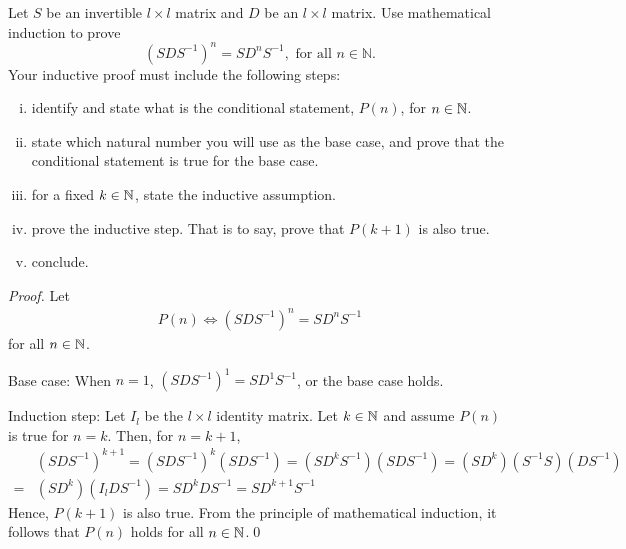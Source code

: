 \begin{question}
\normalfont
Let $S$ be an invertible $l \times l$ matrix and $D$ be an $l \times l$ matrix. Use mathematical induction to prove 
$$
\left(S D S^{-1} \right)^n = S D^n S^{-1}, \text{ for all } n \in \mathbb{N}.
$$ 
Your inductive proof must include the following steps:
	\begin{enumerate}[(i)]
		\item identify and state what is the conditional statement, $P(n)$, for $n\in \mathbb{N}$.
		\item state which natural number you will use as the base case, and prove that the conditional statement is true for the base case.
		\item for a fixed $k\in\mathbb{N}$, state the inductive assumption.
		\item prove the inductive step.  That is to say, prove that $P(k+1)$ is also true.
		\item conclude.
	\end{enumerate}
\end{question}

\begin{proof}
    \renewcommand{\qedsymbol}{$\blacksquare$}
    Let 
    \[
        \begin{aligned}
            P(n)\iff(SDS^{-1})^n=SD^nS^{-1}
        \end{aligned}
    \] for all $n\in\mathbb N$.
    
    Base case: When $n=1$, $(SDS^{-1})^1=SD^1S^{-1}$, or the base case holds.

    Induction step: Let $I_l$ be the $l\times l$ identity matrix. Let $k\in\mathbb N$ and assume $P(n)$ is true for $n=k$.
    Then, for $n=k+1$, 
    \[
        \begin{aligned}
            &(SDS^{-1})^{k+1}
            =(SDS^{-1})^k(SDS^{-1})
            =(SD^kS^{-1})(SDS^{-1})
            =(SD^k)(S^{-1}S)(DS^{-1})\\
            =&(SD^k)(I_lDS^{-1})
            =SD^kDS^{-1}
            =SD^{k+1}S^{-1}
        \end{aligned}
    \]
    Hence, $P(k+1)$ is also true. From the principle of mathematical induction, it follows that $P(n)$ holds for all $n\in\mathbb N$.\qed
    \renewcommand{\qedsymbol}{}
\end{proof}